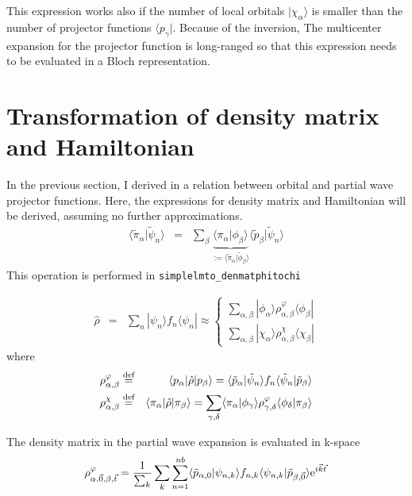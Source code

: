 \documentclass[11pt,a4paper]{report}
\begin{document}
This expression works also if the number of local orbitals
$|\chi_\alpha\rangle$ is smaller than the number of projector
functions $\langle{p}_\gamma|$. Because of the inversion, The
multicenter expansion for the projector function is long-ranged so
that this expression needs to be evaluated in a Bloch representation.

\section{Transformation of density matrix and Hamiltonian}
In the previous section, I derived in  a relation
between orbital and partial wave projector functions. Here, the
expressions for density matrix and Hamiltonian will be derived,
assuming no further approximations.
\begin{eqnarray}
\langle\tilde{\pi}_\alpha|\tilde{\psi}_n\rangle
&=&\sum_\beta 
\underbrace{\langle\pi_\alpha|\phi_\beta\rangle}
_{:=\langle\tilde{\pi}_\alpha|\tilde{\phi}_\beta\rangle}
\langle\tilde{p}_\beta|\tilde{\psi}_n\rangle
\end{eqnarray}
This operation is performed in \verb|simplelmto_denmatphitochi| 

\begin{eqnarray}
\hat{\rho}&=&\sum_n|\psi_n\rangle f_n\langle\psi_n|
\approx
\begin{cases}
\sum_{\alpha,\beta}|\phi_\alpha\rangle 
\rho^{\varphi}_{\alpha,\beta}\langle\phi_\beta|
\\
\sum_{\alpha,\beta}|\chi_\alpha\rangle 
\rho^{\chi}_{\alpha,\beta}\langle\chi_\beta|
\end{cases}
\end{eqnarray}
where
\begin{eqnarray}
\rho^{\varphi}_{\alpha,\beta}
&\stackrel{\text{def}}{=}&\langle{p}_\alpha|\hat{\rho}|p_\beta\rangle
=\langle\tilde{p}_\alpha|\tilde{\psi}_n\rangle f_n
\langle\tilde{\psi}_n|\tilde{p}_\beta\rangle
\\
\rho^{\chi}_{\alpha,\beta}
&\stackrel{\text{def}}{=}&\langle\pi_\alpha|\hat{\rho}|\pi_\beta\rangle
=\sum_{\gamma,\delta}
\langle\pi_\alpha|\phi_\gamma\rangle\rho^{\varphi}_{\gamma,\delta}
\langle\phi_\delta|\pi_\beta\rangle
\end{eqnarray}


The density matrix in the partial wave expansion is evaluated in k-space
\begin{eqnarray}
\rho^{\varphi}_{\alpha,\vec{0},\beta,\vec{t}}
=\frac{1}{\sum_k}\sum_k\sum_{n=1}^{nb}
\langle\tilde{p}_{\alpha,0}|\psi_{n,k}\rangle f_{n,k}
\langle\psi_{n,k}|\tilde{p}_{\beta,\vec{0}}\rangle\mathrm{e}^{i\vec{k}\vec{t}}
\end{eqnarray}
\end{document}
